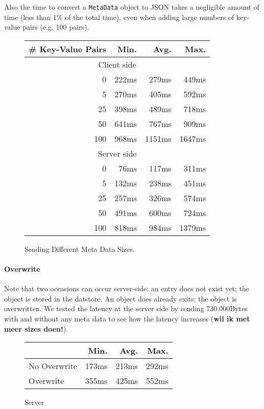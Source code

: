 Also the time to convert a \texttt{MetaData} object to JSON takes a negligible
amount of time (less than 1\% of the total time), even when adding large numbers
of key-value pairs (e.g. 100 pairs).

\begin{figure}
\begin{tabular}{|r|r|r|r|}
\hline
\# Key-Value Pairs & Min. & Avg. & Max. \\
\hline
\multicolumn{4}{|c|}{Client side} \\
\hline
0 & 222ms & 279ms & 449ms \\
5 & 270ms & 405ms & 592ms \\
25 & 398ms & 489ms & 718ms\\
50 &  641ms & 767ms & 909ms \\
100 & 968ms & 1151ms & 1647ms\\
\hline
\multicolumn{4}{|c|}{Server side} \\
\hline
0 & 76ms & 117ms & 311ms \\
5 & 132ms & 238ms & 451ms \\
25 & 257ms & 326ms & 574ms \\
50 & 491ms & 600ms & 724ms \\
100 & 818ms & 984ms & 1379ms \\
\hline
\end{tabular}
\caption{Sending Different Meta Data Sizes. \label{add-md-size}}
\end{figure}

\paragraph{Overwrite}
Note that two occasions can occur server-side: an entry does not exist yet; the
object is stored in the datstore. An object does already exits; the object is
overwritten. We tested the latency at the server side by sending 730.000Bytes
with and without any meta data to see how the latency increases (\textbf{wil ik
met meer sizes doen!}).

\begin{figure}
\begin{tabular}{|l|r|r|r|}
\hline
 & Min. & Avg. & Max. \\
\hline
No Overwrite & 173ms & 213ms & 292ms \\
Overwrite & 355ms & 425ms & 552ms \\
\hline
\end{tabular}
\caption{Server}
\end{figure}

